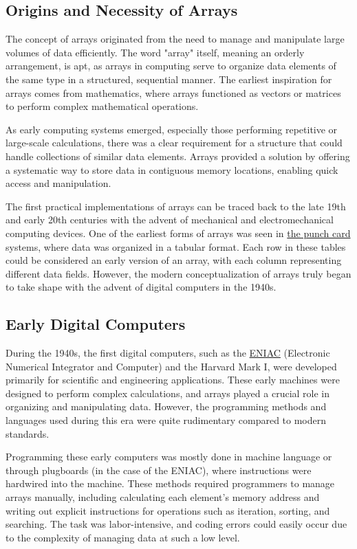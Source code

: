 \documentclass{book}
\begin{document}
	\subsection{Origins and Necessity of Arrays}
	
	The concept of arrays originated from the need to manage and manipulate large volumes of data efficiently. The word "array" itself, meaning an orderly arrangement, is apt, as arrays in computing serve to organize data elements of the same type in a structured, sequential manner. The earliest inspiration for arrays comes from mathematics, where arrays functioned as vectors or matrices to perform complex mathematical operations. 
	
	As early computing systems emerged, especially those performing repetitive or large-scale calculations, there was a clear requirement for a structure that could handle collections of similar data elements. Arrays provided a solution by offering a systematic way to store data in contiguous memory locations, enabling quick access and manipulation.
	
	The first practical implementations of arrays can be traced back to the late 19th and early 20th centuries with the advent of mechanical and electromechanical computing devices. One of the earliest forms of arrays was seen in \href{https://en.wikipedia.org/wiki/Punched_card}{the punch card} systems, where data was organized in a tabular format. Each row in these tables could be considered an early version of an array, with each column representing different data fields. However, the modern conceptualization of arrays truly began to take shape with the advent of digital computers in the 1940s.
	
	\subsection{Early Digital Computers}
	
	During the 1940s, the first digital computers, such as the \href{https://en.wikipedia.org/wiki/ENIAC}{ENIAC} (Electronic Numerical Integrator and Computer) and the Harvard Mark I, were developed primarily for scientific and engineering applications. These early machines were designed to perform complex calculations, and arrays played a crucial role in organizing and manipulating data. However, the programming methods and languages used during this era were quite rudimentary compared to modern standards.
	
	Programming these early computers was mostly done in machine language or through plugboards (in the case of the ENIAC), where instructions were hardwired into the machine. These methods required programmers to manage arrays manually, including calculating each element's memory address and writing out explicit instructions for operations such as iteration, sorting, and searching. The task was labor-intensive, and coding errors could easily occur due to the complexity of managing data at such a low level.
	
\end{document}
